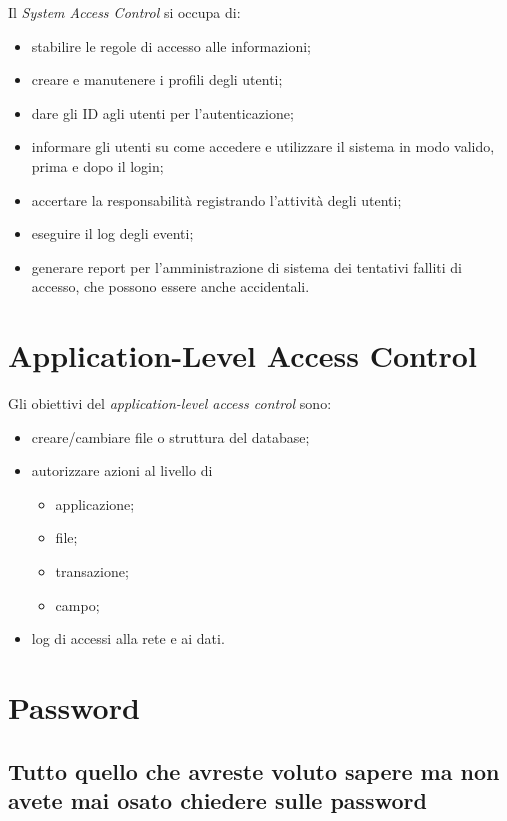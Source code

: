 Il \textit{System Access Control} si occupa di:
\begin{itemize}
  \item stabilire le regole di accesso alle informazioni;
  \item creare e manutenere i profili degli utenti;
  \item dare gli ID agli utenti per l'autenticazione;
  \item informare gli utenti su come accedere e utilizzare il sistema in modo
  valido, prima e dopo il login;
  \item accertare la responsabilità registrando l'attività degli utenti;
  \item eseguire il log degli eventi;
  \item generare report per l'amministrazione di sistema dei tentativi falliti
  di accesso, che possono essere anche accidentali.
\end{itemize}

\section{Application-Level Access Control}

Gli obiettivi del \textit{application-level access control} sono:
\begin{itemize}
 \item creare/cambiare file o struttura del database;
 \item autorizzare azioni al livello di
  \begin{itemize}
   \item applicazione;
   \item file;
   \item transazione;
   \item campo;
  \end{itemize}
\item log di accessi alla rete e ai dati.
\end{itemize}

\section{Password}
\label{Password}

\subsection{Tutto quello che avreste voluto sapere ma non avete mai osato
chiedere sulle password}

